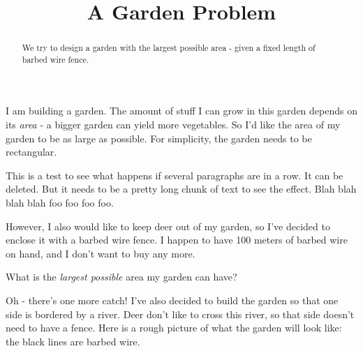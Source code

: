 \documentclass{ximera}
\title{A Garden Problem}
\begin{document}
\begin{abstract}
We try to design a garden with the largest possible area - given a fixed length of barbed wire fence.
\end{abstract}
\maketitle

I am building a garden. The amount of stuff I can grow in this garden depends on its \emph{area} - a bigger garden can yield more vegetables. So I'd like the area of my garden to be as large as possible. For simplicity, the garden needs to be rectangular.

This is a test to see what happens if several paragraphs are in a row. It can be deleted. But it needs to be a pretty long chunk of text to see the effect. Blah blah blah blah foo foo foo foo.

However, I also would like to keep deer out of my garden, so I've decided to enclose it with a barbed wire fence. I happen to have 100 meters of barbed wire on hand, and I don't want to buy any more.

\begin{question}
What is the \emph{largest possible} area my garden can have?
\end{question}

Oh - there's one more catch! I've also decided to build the garden so that one side is bordered by a river. Deer don't like to cross this river, so that side doesn't need to have a fence. Here is a rough picture of what the garden will look like: the black lines are barbed wire.
\end{document}
